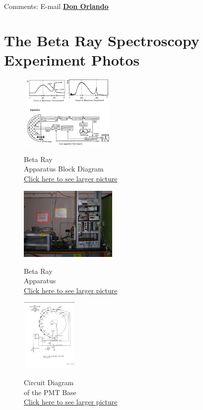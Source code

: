 \documentclass{../lab}
\begin{document}
Comments: E-mail \href{\MailDonOrlando}{\textbf{Don Orlando}}

\section{The Beta Ray Spectroscopy Experiment Photos}

\begin{figure}[H]
\captionsetup{justification=centering}
  \href{http://experimentationlab.berkeley.edu/sites/default/files/images/Bra_1.jpg}{\includegraphics[height=100pt,keepaspectratio]{images/Bra_1.jpg}}
  \caption{Beta Ray \\ Apparatus Block Diagram \\ \href{http://experimentationlab.berkeley.edu/sites/default/files/images/Bra_1.jpg}{Click here to see larger picture}}
  \label{fig:BRayBlock}
\endminipage\hfill
{}
 \href{http://experimentationlab.berkeley.edu/sites/default/files/images/BRA_Rack_1.jpg}{\includegraphics[height=100pt,keepaspectratio]{images/BRA_Rack_1.jpg}}
  \caption{Beta Ray \\ Apparatus\\ \href{http://experimentationlab.berkeley.edu/sites/default/files/images/BRA_Rack_1.jpg}{Click here to see larger picture}}\label{fig:BRayApparatus}
\endminipage\hfill
{}
\centering
  \href{http://experimentationlab.berkeley.edu/sites/default/files/images/RCA6655A_PMT_3.jpg}{\includegraphics[height=100pt,keepaspectratio]{images/RCA6655A_PMT_3.jpg}}
  \caption{Circuit Diagram \\ of the PMT Base \\
  \href{http://experimentationlab.berkeley.edu/sites/default/files/images/RCA6655A_PMT_3.jpg}{Click here to see larger picture}}
  \label{fig:BRayTube}
\endminipage
\end{figure}
\end{document}
